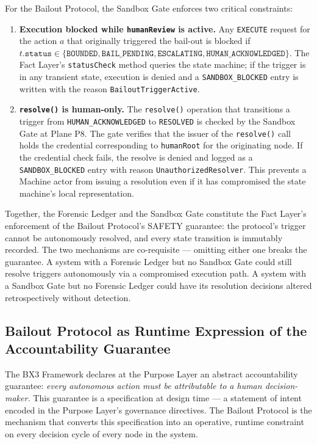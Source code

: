 For the Bailout Protocol, the Sandbox Gate enforces two critical constraints:

\begin{enumerate}
  \item \textbf{Execution blocked while \texttt{humanReview} is active.} Any \texttt{EXECUTE} request for the action $a$ that originally triggered the bail-out is blocked if $t.\texttt{status} \in \{ \texttt{BOUNDED}, \texttt{BAIL\_PENDING}, \texttt{ESCALATING}, \texttt{HUMAN\_ACKNOWLEDGED} \}$. The Fact Layer's \texttt{statusCheck} method queries the state machine; if the trigger is in any transient state, execution is denied and a \texttt{SANDBOX\_BLOCKED} entry is written with the reason \texttt{BailoutTriggerActive}.

  \item \textbf{\texttt{resolve()} is human-only.} The \texttt{resolve()} operation that transitions a trigger from \texttt{HUMAN\_ACKNOWLEDGED} to \texttt{RESOLVED} is checked by the Sandbox Gate at Plane P8. The gate verifies that the issuer of the \texttt{resolve()} call holds the credential corresponding to \texttt{humanRoot} for the originating node. If the credential check fails, the resolve is denied and logged as a \texttt{SANDBOX\_BLOCKED} entry with reason \texttt{UnauthorizedResolver}. This prevents a Machine actor from issuing a resolution even if it has compromised the state machine's local representation.
\end{enumerate}

Together, the Forensic Ledger and the Sandbox Gate constitute the Fact Layer's enforcement of the Bailout Protocol's SAFETY guarantee: the protocol's trigger cannot be autonomously resolved, and every state transition is immutably recorded. The two mechanisms are co-requisite --- omitting either one breaks the guarantee. A system with a Forensic Ledger but no Sandbox Gate could still resolve triggers autonomously via a compromised execution path. A system with a Sandbox Gate but no Forensic Ledger could have its resolution decisions altered retrospectively without detection.

\subsection{Bailout Protocol as Runtime Expression of the Accountability Guarantee}
\label{sec:bailout-runtime-expression}

The BX3 Framework declares at the Purpose Layer an abstract accountability guarantee: \emph{every autonomous action must be attributable to a human decision-maker.} This guarantee is a specification at design time --- a statement of intent encoded in the Purpose Layer's governance directives. The Bailout Protocol is the mechanism that converts this specification into an operative, runtime constraint on every decision cycle of every node in the system.

